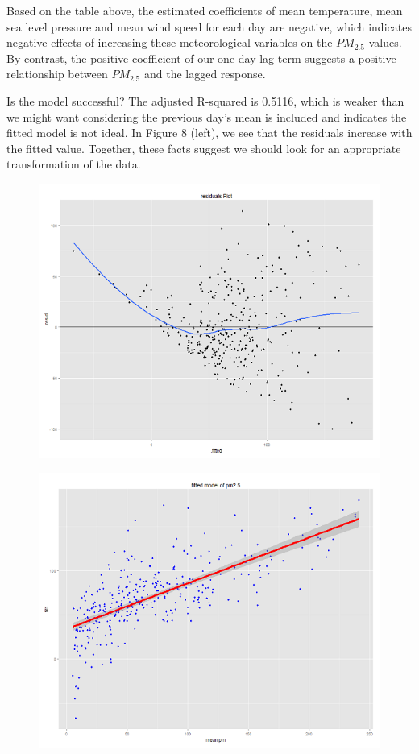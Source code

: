 \documentclass[11pt]{article} %
\begin{document}
Based on the table above, the estimated coefficients of 
mean temperature, mean sea level pressure and mean wind speed for each day are negative, 
which indicates negative effects of increasing these
meteorological variables on the \(PM_{2.5}\) values. 
By contrast, the positive coefficient of our one-day lag term suggests a positive relationship between
\(PM_{2.5}\) and the lagged response.

Is the model successful? The adjusted R-squared is 0.5116, which is weaker than we might want considering the previous day's mean is included and indicates the fitted model is not ideal. 
In Figure 8 (left), we see that the residuals increase with the fitted value. Together, these facts suggest we should look for an appropriate transformation of the data.

\begin{figure}
\centering
\begin{minipage}{.5\textwidth}
  \centering
  \includegraphics[width=\linewidth]{Figure2-2}
  \label{fig:test1}
\end{minipage}%
\begin{minipage}{.5\textwidth}
  \centering
  \includegraphics[width=\linewidth]{Figure2-3}

\end{minipage}
\end{figure}
\end{document}
